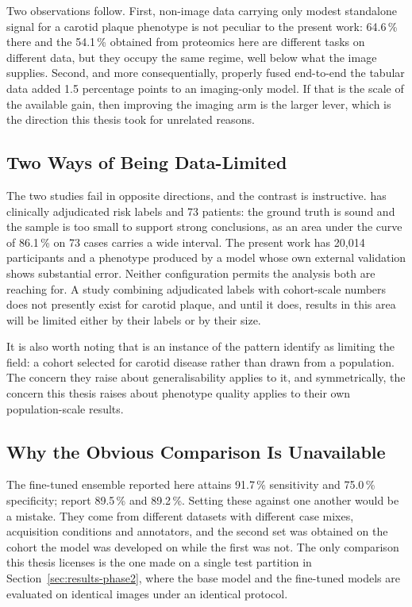 Two observations follow. First, non-image data carrying only modest standalone signal for a
carotid plaque phenotype is not peculiar to the present work: 64.6\,\% there and the 54.1\,\%
obtained from proteomics here are different tasks on different data, but they occupy the same
regime, well below what the image supplies. Second, and more consequentially, properly fused
end-to-end the tabular data added 1.5 percentage points to an imaging-only model. If that is the
scale of the available gain, then improving the imaging arm is the larger lever, which is the
direction this thesis took for unrelated reasons.

\subsection{Two Ways of Being Data-Limited}

The two studies fail in opposite directions, and the contrast is instructive. \textcite{stamos2025}
has clinically adjudicated risk labels and 73 patients: the ground truth is sound and the sample
is too small to support strong conclusions, as an area under the curve of 86.1\,\% on 73 cases
carries a wide interval. The present work has 20{,}014 participants and a phenotype produced by a
model whose own external validation shows substantial error. Neither configuration permits the
analysis both are reaching for. A study combining adjudicated labels with cohort-scale numbers
does not presently exist for carotid plaque, and until it does, results in this area will be
limited either by their labels or by their size.

It is also worth noting that \textcite{stamos2025} is an instance of the pattern
\textcite{omarov2024deep} identify as limiting the field: a cohort selected for carotid disease
rather than drawn from a population. The concern they raise about generalisability applies to it,
and symmetrically, the concern this thesis raises about phenotype quality applies to their own
population-scale results.

\subsection{Why the Obvious Comparison Is Unavailable}

The fine-tuned ensemble reported here attains 91.7\,\% sensitivity and 75.0\,\% specificity;
\textcite{omarov2024deep} report 89.5\,\% and 89.2\,\%. Setting these against one another would be
a mistake. They come from different datasets with different case mixes, acquisition conditions and
annotators, and the second set was obtained on the cohort the model was developed on while the
first was not. The only comparison this thesis licenses is the one made on a single test partition
in Section~\ref{sec:results-phase2}, where the base model and the fine-tuned models are evaluated
on identical images under an identical protocol.

